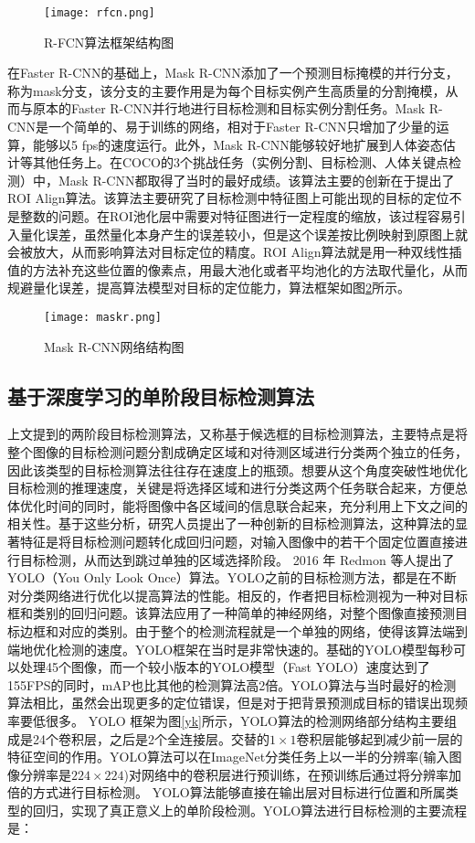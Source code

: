 \begin{figure}[htbp]
    \centering
    \texttt{[image: rfcn.png]}
    \caption{R-FCN算法框架结构图\cite{dai2016r}}
    \label{rfcn}
\end{figure}
在Faster R-CNN的基础上，Mask R-CNN添加了一个预测目标掩模的并行分支，称为mask分支，该分支的主要作用是为每个目标实例产生高质量的分割掩模，从而与原本的Faster R-CNN并行地进行目标检测和目标实例分割任务。Mask R-CNN是一个简单的、易于训练的网络，相对于Faster R-CNN只增加了少量的运算，能够以5 fps的速度运行。此外，Mask R-CNN能够较好地扩展到人体姿态估计等其他任务上。在COCO的3个挑战任务（实例分割、目标检测、人体关键点检测）中，Mask R-CNN都取得了当时的最好成绩。该算法主要的创新在于提出了ROI Align算法。该算法主要研究了目标检测中特征图上可能出现的目标的定位不是整数的问题。在ROI池化层中需要对特征图进行一定程度的缩放，该过程容易引入量化误差，虽然量化本身产生的误差较小，但是这个误差按比例映射到原图上就会被放大，从而影响算法对目标定位的精度。ROI Align算法就是用一种双线性插值的方法补充这些位置的像素点，用最大池化或者平均池化的方法取代量化，从而规避量化误差，提高算法模型对目标的定位能力，算法框架如图\ref{maskr}所示。

\begin{figure}[htbp]
    \centering
    \texttt{[image: maskr.png]}
    \caption{Mask R-CNN网络结构图\cite{he2017mask}}
    \label{maskr}
\end{figure}

\subsection{基于深度学习的单阶段目标检测算法}
上文提到的两阶段目标检测算法，又称基于候选框的目标检测算法，主要特点是将整个图像的目标检测问题分割成确定区域和对待测区域进行分类两个独立的任务，因此该类型的目标检测算法往往存在速度上的瓶颈。想要从这个角度突破性地优化目标检测的推理速度，关键是将选择区域和进行分类这两个任务联合起来，方便总体优化时间的同时，能将图像中各区域间的信息联合起来，充分利用上下文之间的相关性。基于这些分析，研究人员提出了一种创新的目标检测算法，这种算法的显著特征是将目标检测问题转化成回归问题，对输入图像中的若干个固定位置直接进行目标检测，从而达到跳过单独的区域选择阶段\cite{jiao2019survey,wu2020recent}。
2016 年 Redmon 等人提出了 YOLO（You Only Look Once）算法\cite{redmon2016you}。YOLO之前的目标检测方法，都是在不断对分类网络进行优化以提高算法的性能。相反的，作者把目标检测视为一种对目标框和类别的回归问题。该算法应用了一种简单的神经网络，对整个图像直接预测目标边框和对应的类别。由于整个的检测流程就是一个单独的网络，使得该算法端到端地优化检测的速度。YOLO框架在当时是非常快速的。基础的YOLO模型每秒可以处理45个图像，而一个较小版本的YOLO模型（Fast YOLO）速度达到了155FPS的同时，mAP也比其他的检测算法高2倍。YOLO算法与当时最好的检测算法相比，虽然会出现更多的定位错误，但是对于把背景预测成目标的错误出现频率要低很多。
YOLO 框架为图\ref{yk}所示，YOLO算法的检测网络部分结构主要组成是24个卷积层，之后是2个全连接层。交替的$1\times1$卷积层能够起到减少前一层的特征空间的作用。YOLO算法可以在ImageNet分类任务上以一半的分辨率(输入图像分辨率是$224\times224$)对网络中的卷积层进行预训练，在预训练后通过将分辨率加倍的方式进行目标检测。
YOLO算法能够直接在输出层对目标进行位置和所属类型的回归，实现了真正意义上的单阶段检测。YOLO算法进行目标检测的主要流程是：

